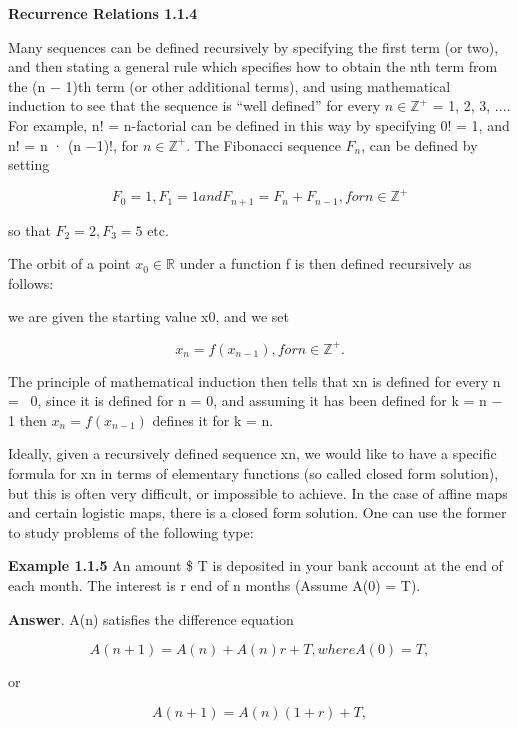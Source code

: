 \documentclass[12pt]{article}
\begin{document}
\begin{enumerate}
\hfill

\textbf{Recurrence Relations 1.1.4}

\hfill

Many sequences can be defined recursively by specifying the first term (or two),
and then stating a general rule which specifies how to obtain the nth term from the
(n − 1)th term (or other additional terms), and using mathematical induction to see
that the sequence is “well defined” for every $n \in  \mathbb{Z}^{+}$ = {1, 2, 3, ...}. For example,
n! = n-factorial can be defined in this way by specifying 0! = 1, and n! = n · (n −1)!,
for $n \in \mathbb{Z}^{+}$. The Fibonacci sequence $F_n$, can be defined by setting

\[
F_0 = 1, F_1 = 1 and F_{n+1} = F_n + F_{n−1}, for n \in \mathbb{Z}^{+}
\]

so that $F_2 = 2, F_3 = 5$ etc.

\hfill

The orbit of a point $x_0 \in \mathbb{R}$ under a function f is then defined recursively as follows:

we are given the starting value x0, and we set

\[
x_n = f(x_{n−1}), for n \in \mathbb{Z}^{+}.
\]

The principle of mathematical induction then tells that xn is defined for every n =  0,
since it is defined for n = 0, and assuming it has been defined for k = n − 1 then
$x_n = f(x_{n−1})$ defines it for k = n.

\hfill

Ideally, given a recursively defined sequence xn, we would like to have a specific
formula for xn in terms of elementary functions (so called closed form solution), but
this is often very difficult, or impossible to achieve. In the case of affine maps and
certain logistic maps, there is a closed form solution. One can use the former to study
problems of the following type:

\hfill

\textbf{Example 1.1.5} An amount \$ T is deposited in your bank account at the end of each
month. The interest is r%
end of n months (Assume A(0) = T).

\hfill

\textbf{Answer}. A(n) satisfies the difference equation

\[
A(n + 1) = A(n) + A(n)r + T, where A(0) = T,
\]

or

\[
A(n + 1) = A(n)(1 + r) + T,
\]


\end{enumerate}
\end{document}
